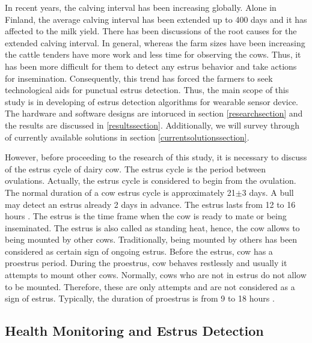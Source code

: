 \documentclass[english,12pt,a4paper,pdftex,elec,utf8]{aaltothesis}
\begin{document}
In recent years, the calving interval has been increasing globally. Alone in Finland, the average calving interval has been extended up to 400 days and it has affected to the milk yield. There has been discussions of the root causes for the extended calving interval. In general, whereas the farm sizes have been increasing the cattle tenders have more work and less time for observing the cows. Thus, it has been more difficult for them to detect any estrus behavior and take actions for insemination. Consequently, this trend has forced the farmers to seek technological aids for punctual estrus detection. Thus, the main scope of this study is in developing of estrus detection algorithms for wearable sensor device. The hardware and software designs are intoruced in section \ref{researchsection} and the results are discussed in \ref{resultssection}. Additionally, we will survey through of currently available solutions in section \ref{currentsolutionssection}.

However, before proceeding to the research of this study, it is necessary to discuss of the estrus cycle of dairy cow. The estrus cycle is the period between ovulations. Actually, the estrus cycle is considered to begin from the ovulation. The normal duration of a cow estrus cycle is approximately 21$\pm$3 days. A bull may detect an estrus already 2 days in advance. The estrus lasts from 12 to 16 hours \cite{julkaisuja52}. The estrus is the time frame when the cow is ready to mate or being inseminated. The estrus is also called as standing heat, hence, the cow allows to being mounted by other cows. Traditionally, being mounted by others has been considered as certain sign of ongoing estrus. Before the estrus, cow has a proestrus period. During the proestrus, cow behaves restlessly and usually it attempts to mount other cows. Normally, cows who are not in estrus do not allow to be mounted. Therefore, these are only attempts and are not considered as a sign of estrus. Typically, the duration of proestrus is from 9 to 18 hours \cite{lehmahavaintoja}.




\subsection{Health Monitoring and Estrus Detection} \label{healthmonitoringandestrusdetectionsection}
\end{document}

